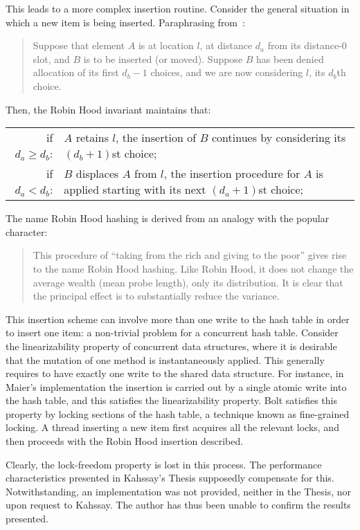 This leads to a more complex insertion routine.
Consider the general situation in which a new item is being inserted.
Paraphrasing from~\cite{robin-hood}:
\begin{quote}
	Suppose that element $A$ is at location $l$, at distance $d_a$ from its distance-0 slot, and $B$ is to be inserted (or moved).
	Suppose $B$ has been denied allocation of its first $d_b - 1$ choices, and we are now considering $l$, its $d_b$th choice.
\end{quote}
Then, the Robin Hood invariant maintains that:

\begin{tabular}{rp{8cm}}
	if $d_a \geq d_b$: & $A$ retains $l$, the insertion of $B$ continues by considering its $(d_b + 1)$st choice; \\
	if $d_a < d_b$: & $B$ displaces $A$ from $l$, the insertion procedure for $A$ is applied starting with its next $(d_a + 1)$st choice; \\
\end{tabular}

The name Robin Hood hashing is derived from an analogy with the popular character:
\begin{quote}
	This procedure of ``taking from the rich and giving to the poor'' gives rise to the name Robin Hood hashing.
	Like Robin Hood, it does not change the average wealth (mean probe length), only its distribution.
	It is clear that the principal effect is to substantially reduce the variance.
\end{quote}

This insertion scheme can involve more than one write to the hash table in order to insert one item: a non-trivial problem for a concurrent hash table.
Consider the linearizability property of concurrent data structures, where it is desirable that the mutation of one method is instantaneously applied.
This generally requires to have exactly one write to the shared data structure.
For instance, in Maier's implementation the insertion is carried out by a single atomic write into the hash table, and this satisfies the linearizability property.
Bolt satisfies this property by locking sections of the hash table, a technique known as fine-grained locking.
A thread inserting a new item first acquires all the relevant locks, and then proceeds with the Robin Hood insertion described.

Clearly, the lock-freedom property is lost in this process.
The performance characteristics presented in Kahssay's Thesis supposedly compensate for this.
Notwithstanding, an implementation was not provided, neither in the Thesis, nor upon request to Kahssay.
The author has thus been unable to confirm the results presented.

